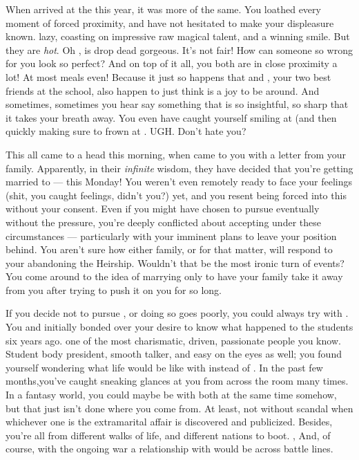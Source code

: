 \documentclass[char]{GL2020}
\begin{document}
{When \cChupStudent{\they} arrived at the \pSchool{} this year, it was more of the same. You loathed every moment of forced proximity, and have not hesitated to make your displeasure known. \cChupStudent{\They \are} lazy, coasting on impressive raw magical talent, and a winning smile. But they are \emph{hot}. Oh \cTechGod{}, \cChupStudent{} is drop dead gorgeous. It’s not fair! How can someone so wrong for you look so perfect? And on top of it all, you both are in close proximity a lot!  At most meals even!  Because it just so happens that \cAmbition{} and \cPresident{}, your two best friends at the school, also happen to just think \cChupStudent{} is a joy to be around.  And sometimes, sometimes you hear \cChupStudent{} say something that is so insightful, so sharp that it takes your breath away.  You even have caught yourself smiling at \cChupStudent{} (and then quickly making sure to frown at \cChupStudent{\them}.  UGH.  Don’t \cChupStudent{\they} hate you?  

This all came to a head this morning, when \cDiplomat{} came to you with a letter from your family. Apparently, in their \emph{infinite} wisdom, they have decided that you're getting married to \cChupStudent{} — this Monday! You weren't even remotely ready to face your feelings (shit, you caught feelings, didn’t you?) yet, and you resent being forced into this without your consent. Even if you might have chosen to pursue \cChupStudent{} eventually without the pressure, you're deeply conflicted about accepting under these circumstances — particularly with your imminent plans to leave your position behind. You aren't sure how either family, or \cChupStudent{} for that matter, will respond to your abandoning the Heirship. Wouldn't that be the most ironic turn of events? You come around to the idea of marrying \cChupStudent{} only to have your family take it away from you after trying to push it on you for so long. 

If you decide not to pursue \cChupStudent{}, or doing so goes poorly, you could always try with \cPresident{\full}. You and \cPresident{} initially bonded over your desire to know what happened to the students six years ago. \cPresident{\They} \cPresident{\are} one of the most charismatic, driven, passionate people you know.   Student body president, smooth talker, and easy on the eyes as well; you  found yourself wondering what life would be like with \cPresident{} instead of \cChupStudent{}. In the past few months,you've caught \cPresident{} sneaking glances at you from across the room many times. In a fantasy world, you could maybe be with both at the same time somehow, but that just isn't done where you come from. At least, not without scandal when whichever one is the extramarital affair is discovered and publicized. Besides, you're all from different walks of life, and different nations to boot. , And, of course, with the ongoing war a relationship with \cPresident{} would be across battle lines.

}
\end{document}
